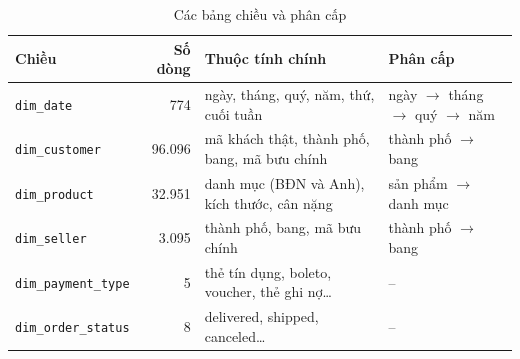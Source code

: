 \documentclass[12pt,a4paper]{article}
\newcommand{\code}[1]{\texttt{\small #1}}
\begin{document}
\begin{table}[h]
\centering
\caption{Các bảng chiều và phân cấp}\label{tab:dims}
\small
\begin{tabularx}{\textwidth}{@{}l r X X@{}}
\toprule
\textbf{Chiều} & \textbf{Số dòng} & \textbf{Thuộc tính chính} & \textbf{Phân cấp}\\
\midrule
\code{dim\_date} & 774 & ngày, tháng, quý, năm, thứ, cuối tuần & ngày $\to$ tháng $\to$ quý $\to$ năm\\
\code{dim\_customer} & 96.096 & mã khách thật, thành phố, bang, mã bưu chính & thành phố $\to$ bang\\
\code{dim\_product} & 32.951 & danh mục (BĐN và Anh), kích thước, cân nặng & sản phẩm $\to$ danh mục\\
\code{dim\_seller} & 3.095 & thành phố, bang, mã bưu chính & thành phố $\to$ bang\\
\code{dim\_payment\_type} & 5 & thẻ tín dụng, boleto, voucher, thẻ ghi nợ\ldots & --\\
\code{dim\_order\_status} & 8 & delivered, shipped, canceled\ldots & --\\
\bottomrule
\end{tabularx}
\end{table}
\end{document}
